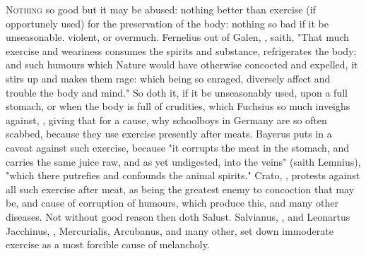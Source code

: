 \lettrine{N}{othing} so good but it may be abused: nothing better than exercise
(if opportunely used) for the preservation of the body: nothing so bad if it be
unseasonable. violent, or overmuch. Fernelius out of Galen,
, saith, "That
much exercise and weariness consumes the spirits and substance, refrigerates
the body; and such humours which Nature would have otherwise concocted and
expelled, it stirs up and makes them rage: which being so enraged, diversely
affect and trouble the body and mind." So doth it, if it be unseasonably used,
upon a full stomach, or when the body is full of crudities, which Fuchsius so
much inveighs against, ,
giving that for a cause, why schoolboys in Germany are so often scabbed,
because they use exercise presently after meats. Bayerus
puts in a caveat against such exercise, because "it
corrupts the meat in the stomach, and carries the same
juice raw, and as yet undigested, into the veins" (saith Lemnius), "which there
putrefies and confounds the animal spirits." Crato,
, protests against
all such exercise after meat, as being the greatest enemy to concoction that
may be, and cause of corruption of humours, which produce this, and many other
diseases. Not without good reason then doth Salust. Salvianus,
, and Leonartus Jacchinus,
, Mercurialis, Arcubanus, and many other,
set down immoderate exercise as a most forcible cause of
melancholy.


